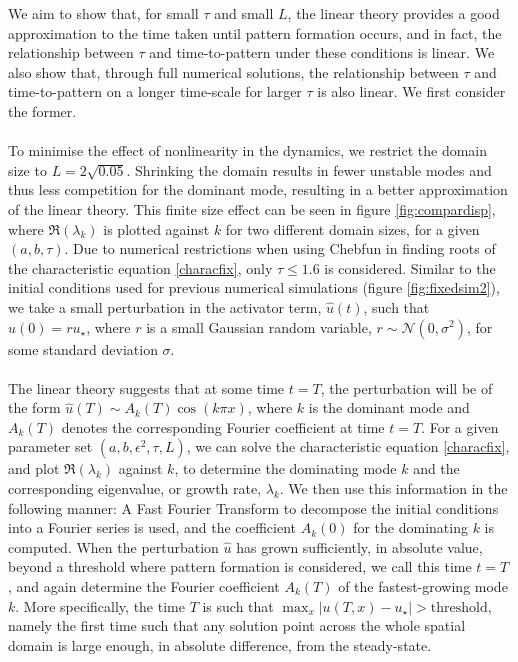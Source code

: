 We aim to show that, for small $\tau$ and small $L$, the linear theory provides a good approximation to the time taken until pattern formation occurs, and in fact, the relationship between $\tau$ and time-to-pattern under these conditions is linear. We also show that, through full numerical solutions, the relationship between $\tau$ and time-to-pattern on a longer time-scale for larger $\tau$ is also linear. We first consider the former.
\\\\
To minimise the effect of nonlinearity in the dynamics, we restrict the domain size to $L=2\sqrt{0.05}$. Shrinking the domain results in fewer unstable modes and thus less competition for the dominant mode, resulting in a better approximation of the linear theory. This finite size effect can be seen in figure \ref{fig:compardisp}, where $\Re(\lambda_k)$ is plotted against $k$ for two different domain sizes, for a given $(a,b,\tau)$. Due to numerical restrictions when using Chebfun in finding roots of the characteristic equation \eqref{characfix}, only $\tau\leq1.6$ is considered. Similar to the initial conditions used for previous numerical simulations (figure \ref{fig:fixedsim2}), we take a small perturbation in the activator term, $\hat{u}(t)$, such that $\hat{u}(0)=ru_\star$, where $r$ is a small Gaussian random variable, $r\sim\mathcal{N}(0,\sigma^2)$,
for some standard deviation $\sigma$.
\\\\
The linear theory suggests that at some time $t=T$, the perturbation will be of the form $\hat{u}(T)\sim A_k(T)\cos(k\pi x)$, where $k$ is the dominant mode and $A_k(T)$ denotes the corresponding Fourier coefficient at time $t=T$. For a given parameter set $(a,b,\epsilon^2,\tau,L)$, we can solve the characteristic equation \eqref{characfix}, and plot $\Re(\lambda_k)$
against $k$, to determine the dominating mode $k$ and the corresponding eigenvalue, or growth rate, $\lambda_k$. We then use this information in the following manner: A Fast Fourier Transform to decompose the initial conditions into a Fourier series is used, and the coefficient $A_k(0)$ for the dominating $k$ is computed. When the perturbation $\hat{u}$ has grown sufficiently, in absolute value, beyond a threshold where pattern formation is considered, we call this time $t=T$, and again determine the Fourier coefficient $A_k(T)$ of the fastest-growing mode $k$. More specifically, the time $T$ is such that $\max_x|u(T,x)-u_\star|>\text{threshold}$, namely the first time such that any solution point across the whole spatial domain is large enough, in absolute difference, from the steady-state.
